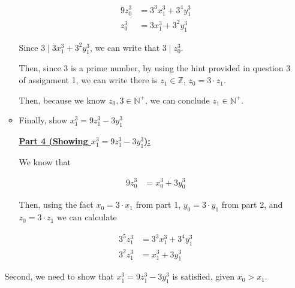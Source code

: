 \documentclass[12pt]{article}
\begin{document}
\begin{mdframed}
\begin{enumerate}[1.]
\begin{itemize}
\begin{mdframed}
            \begin{align}
                9z_0^3 &= 3^3x_1^3 + 3^4y_1^3\\
                z_0^3 &= 3x_1^3 + 3^2y_1^3
            \end{align}

            \bigskip

            Since $3 \mid 3x_1^3 + 3^2y_1^3$, we can write that $3 \mid z_0^3$.

            \bigskip

            Then, since 3 is a prime number, by using the hint provided in question 3
            of assignment 1, we can write there is $z_1 \in \mathbb{Z}$, $z_0 = 3 \cdot z_1$.

            \bigskip

            Then, because we know $z_0, 3 \in \mathbb{N}^+$, we can conclude
            $z_1 \in \mathbb{N}^+$.

            \end{mdframed}

            \item Finally, show $x_1^3 = 9z_1^3 - 3y_1^3$

            \begin{mdframed}
            \underline{\textbf{Part 4 (Showing $x_1^3 = 9z_1^3 - 3y_1^3$):}}

            \bigskip

            We know that

            \begin{align}
                9z_0^3 &= x_0^3 + 3y_0^3
            \end{align}

            \bigskip

            Then, using the fact $x_0 = 3 \cdot x_1$ from part 1,
            $y_0 = 3 \cdot y_1$ from part 2, and $z_0 = 3 \cdot z_1$ we can calculate

            \begin{align}
                3^5z_1^3 &= 3^3x_1^3 + 3^4y_1^3\\
                3^2z_1^3 &= x_1^3 + 3y_1^3
            \end{align}

            \end{mdframed}
        \end{itemize}

        \bigskip

        \begin{mdframed}
        Second, we need to show that $x_1^3 = 9z_1^3 - 3y_1^3$ is satisfied, given
        $x_0 > x_1$.


\end{mdframed}
\end{enumerate}
\end{mdframed}
\end{document}
